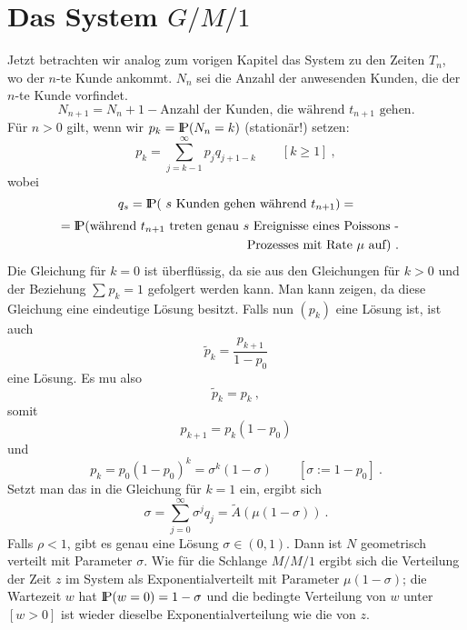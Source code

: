 \section{Das System $G/M/1$}
Jetzt betrachten wir analog zum vorigen Kapitel das System zu den Zeiten
$T_{n}$, wo der $n$-te Kunde ankommt. $N_{n}$ sei die Anzahl der
anwesenden Kunden, die der $n$-te Kunde vorfindet.
\begin{displaymath}
N_{n+1} = N_{n}+1-\mbox{Anzahl der Kunden, die während $t_{n+1}$ gehen.}
\end{displaymath}
Für $n>0$ gilt, wenn wir $p_{k}= {\rm I\kern-0.2em P} (N_{n}=k)$ (stationär!) setzen:
\begin{displaymath}
p_{k} = \sum_{j=k-1}^{\infty} p_{j} q_{j+1-k} \qquad [k \geq 1] ~,
\end{displaymath}
wobei
\begin{displaymath}
q_{s} = {\rm I\kern-0.2em P} (\mbox{ $s$ Kunden gehen während
$t_{n+1}$)} =
\end{displaymath}
\begin{eqnarray*}
= {\rm I\kern-0.2em P} (\mbox{während $t_{n+1}$ treten genau $s$ Ereignisse eines Poissons
-} \\
\mbox{Prozesses mit Rate $\mu$ auf)} ~. & &
\end{eqnarray*}
Die Gleichung für $k=0$ ist überflüssig, da sie aus den Gleichungen
für $k>0$ und der Beziehung $\sum_{}^{} p_{k}=1$ gefolgert werden kann.
Man kann zeigen, da\3 diese Gleichung eine eindeutige Lösung besitzt.
Falls nun $(p_{k})$ eine Lösung ist, ist auch
\begin{displaymath}
\tilde p_{k} = \frac{p_{k+1}}{1-p_{0}}
\end{displaymath}
eine Lösung. Es mu\3 also
\begin{displaymath}
\tilde p_{k} = p_{k} ~,
\end{displaymath}
somit
\begin{displaymath}
p_{k+1} = p_{k}(1-p_{0})
\end{displaymath}
und
\begin{displaymath}
p_{k} = p_{0}(1-p_{0})^{k} =
\sigma^{k}(1- \sigma) \qquad [ \sigma := 1 - p_{0}] ~.
\end{displaymath}
Setzt man das in die Gleichung für $k=1$ ein, ergibt sich
\begin{displaymath}
\sigma = \sum_{j=0}^{\infty} \sigma^{j} q_{j} = \tilde A (\mu(1-\sigma))
~.
\end{displaymath}
Falls $\rho < 1$, gibt es genau eine Lösung $\sigma \in (0,1)$. Dann ist
$N$ geometrisch verteilt mit Parameter $\sigma$. Wie für die Schlange
$M/M/1$ ergibt sich die Verteilung der Zeit $z$ im System als
Exponentialverteilt mit Parameter $\mu(1- \sigma)$; die Wartezeit $w$ hat
${\rm I\kern-0.2em P} (w=0)= 1 - \sigma$ und die bedingte Verteilung von $w$ unter $[w>0]$
ist wieder dieselbe Exponentialverteilung wie die von $z$.
